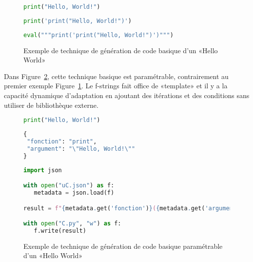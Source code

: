 \begin{figure}
\begin{lstlisting}[language=Python, upquote=true, caption={C de Figure~\ref{fig:exemple_gen_code_basique}}, label={lst:gen_code_basique_c}]
print("Hello, World!")
\end{lstlisting}

\begin{lstlisting}[language=Python, upquote=true, caption={µ$_C$ de Figure~\ref{fig:exemple_gen_code_basique}}, label={lst:gen_code_basique_uc}]
print('print("Hello, World!")')
\end{lstlisting}

\begin{lstlisting}[language=Python, upquote=true, caption={M(µ$_C$) de Figure~\ref{fig:exemple_gen_code_basique}}, label={lst:gen_code_basique_m}]
eval("""print('print("Hello, World!")')""")
\end{lstlisting}
\caption{Exemple de technique de génération de code basique d'un «Hello World»}
\label{fig:exemple_gen_code_basique}
\end{figure}

Dans Figure~\ref{fig:exemple_gen_code_basique_2}, cette technique basique est paramétrable, contrairement au premier exemple Figure~\ref{fig:exemple_gen_code_basique}. Le f-strings fait office de «template» et il y a la capacité dynamique d’adaptation en ajoutant des itérations et des conditions sans utiliser de bibliothèque externe.

\begin{figure}
\begin{lstlisting}[language=Python, upquote=true, caption={C - fichier C.py de Figure~\ref{fig:exemple_gen_code_basique_2}}, label={lst:gen_code_basique_2_c}]
print("Hello, World!")
\end{lstlisting}

\begin{lstlisting}[language=Python, upquote=true, caption={µ$_C$ - fichier uC.json de Figure~\ref{fig:exemple_gen_code_basique_2}}, label={lst:gen_code_basique_2_uc}]
{
 "fonction": "print",
 "argument": "\"Hello, World!\""
}
\end{lstlisting}

\begin{lstlisting}[language=Python, upquote=true, caption={M(µ$_C$) de Figure~\ref{fig:exemple_gen_code_basique_2}}, label={lst:gen_code_basique_2_m}]
import json

with open("uC.json") as f:
   metadata = json.load(f)

result = f"{metadata.get('fonction')}({metadata.get('argument')})\n"

with open("C.py", "w") as f:
   f.write(result)
\end{lstlisting}
\caption{Exemple de technique de génération de code basique paramétrable d'un «Hello World»}
\label{fig:exemple_gen_code_basique_2}
\end{figure}

